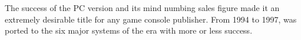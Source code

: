 The success of the PC version and its mind numbing sales figure made it an extremely desirable title for any game console publisher. From 1994 to 1997, \doom{} was ported to the six major systems of the era with more or less success.\\
\par


